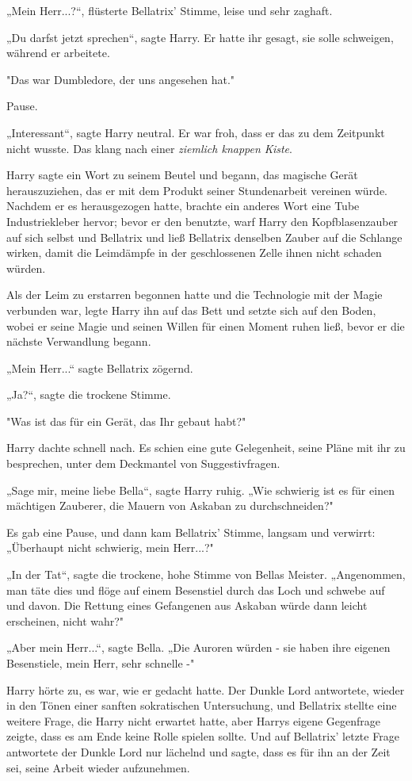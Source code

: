 {„Mein Herr...?“, flüsterte Bellatrix' Stimme, leise und sehr zaghaft.

„Du darfst jetzt sprechen“, sagte Harry. Er hatte ihr gesagt, sie solle schweigen, während er arbeitete.

"Das war Dumbledore, der uns angesehen hat."

Pause.

„Interessant“, sagte Harry neutral. Er war froh, dass er das zu dem Zeitpunkt nicht wusste. Das klang nach einer \emph{ziemlich knappen Kiste}.

Harry sagte ein Wort zu seinem Beutel und begann, das magische Gerät herauszuziehen, das er mit dem Produkt seiner Stundenarbeit vereinen würde. Nachdem er es herausgezogen hatte, brachte ein anderes Wort eine Tube Industriekleber hervor; bevor er den benutzte, warf Harry den Kopfblasenzauber auf sich selbst und Bellatrix und ließ Bellatrix denselben Zauber auf die Schlange wirken, damit die Leimdämpfe in der geschlossenen Zelle ihnen nicht schaden würden.

Als der Leim zu erstarren begonnen hatte und die Technologie mit der Magie verbunden war, legte Harry ihn auf das Bett und setzte sich auf den Boden, wobei er seine Magie und seinen Willen für einen Moment ruhen ließ, bevor er die nächste Verwandlung begann.

„Mein Herr...“ sagte Bellatrix zögernd.

„Ja?“, sagte die trockene Stimme.

"Was ist das für ein Gerät, das Ihr gebaut habt?"

Harry dachte schnell nach. Es schien eine gute Gelegenheit, seine Pläne mit ihr zu besprechen, unter dem Deckmantel von Suggestivfragen.

„Sage mir, meine liebe Bella“, sagte Harry ruhig. „Wie schwierig ist es für einen mächtigen Zauberer, die Mauern von Askaban zu durchschneiden?"

Es gab eine Pause, und dann kam Bellatrix' Stimme, langsam und verwirrt: „Überhaupt nicht schwierig, mein Herr...?"

„In der Tat“, sagte die trockene, hohe Stimme von Bellas Meister. „Angenommen, man täte dies und flöge auf einem Besenstiel durch das Loch und schwebe auf und davon. Die Rettung eines Gefangenen aus Askaban würde dann leicht erscheinen, nicht wahr?"

„Aber mein Herr...“, sagte Bella. „Die Auroren würden - sie haben ihre eigenen Besenstiele, mein Herr, sehr schnelle -"

Harry hörte zu, es war, wie er gedacht hatte. Der Dunkle Lord antwortete, wieder in den Tönen einer sanften sokratischen Untersuchung, und Bellatrix stellte eine weitere Frage, die Harry nicht erwartet hatte, aber Harrys eigene Gegenfrage zeigte, dass es am Ende keine Rolle spielen sollte. Und auf Bellatrix' letzte Frage antwortete der Dunkle Lord nur lächelnd und sagte, dass es für ihn an der Zeit sei, seine Arbeit wieder aufzunehmen.

}
